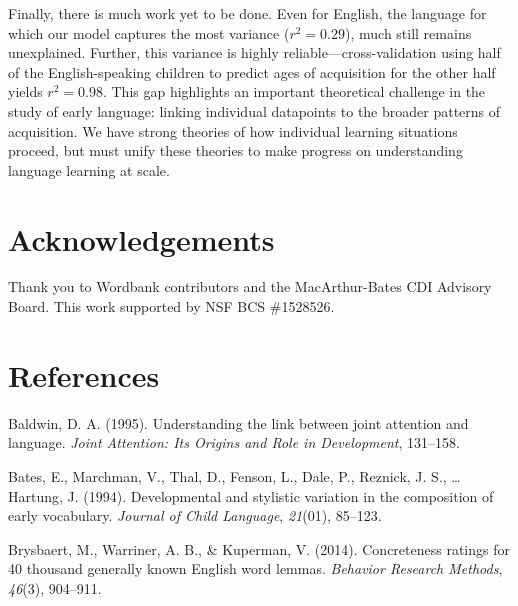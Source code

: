 \documentclass[10pt, letterpaper]{article}
\begin{document}
Finally, there is much work yet to be done. Even for English, the
language for which our model captures the most variance
(\(r^2 = 0.29\)), much still remains unexplained. Further, this variance
is highly reliable---cross-validation using half of the English-speaking
children to predict ages of acquisition for the other half yields
\(r^2 = 0.98\). This gap highlights an important theoretical challenge
in the study of early language: linking individual datapoints to the
broader patterns of acquisition. We have strong theories of how
individual learning situations proceed, but must unify these theories to
make progress on understanding language learning at scale.

\vspace{1em}

\vspace{1em}

\section{Acknowledgements}\label{acknowledgements}

Thank you to Wordbank contributors and the MacArthur-Bates CDI Advisory
Board. This work supported by NSF BCS \#1528526.

\newpage

\section{References}\label{references}

\setlength{\parindent}{-0.1in} \setlength{\leftskip}{0.125in} \noindent

Baldwin, D. A. (1995). Understanding the link between joint attention
and language. \emph{Joint Attention: Its Origins and Role in
Development}, 131--158.

Bates, E., Marchman, V., Thal, D., Fenson, L., Dale, P., Reznick, J. S.,
\ldots{} Hartung, J. (1994). Developmental and stylistic variation in
the composition of early vocabulary. \emph{Journal of Child Language},
\emph{21}(01), 85--123.

Brysbaert, M., Warriner, A. B., \& Kuperman, V. (2014). Concreteness
ratings for 40 thousand generally known English word lemmas.
\emph{Behavior Research Methods}, \emph{46}(3), 904--911.
\end{document}
